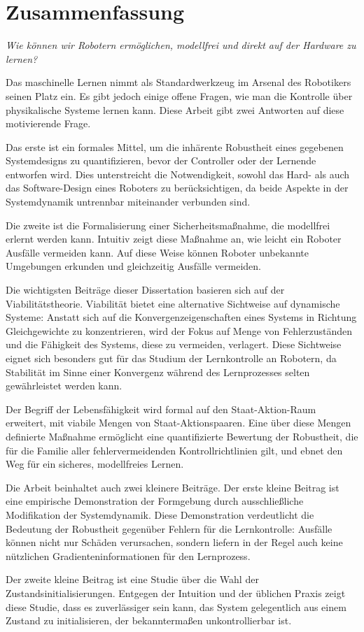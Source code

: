 
\chapter*{Zusammenfassung}
\emph{Wie können wir Robotern ermöglichen, modellfrei und direkt auf der Hardware zu lernen?} \par

Das maschinelle Lernen nimmt als Standardwerkzeug im Arsenal des Robotikers seinen Platz ein. Es gibt jedoch einige offene Fragen, wie man die Kontrolle über physikalische Systeme lernen kann. Diese Arbeit gibt zwei Antworten auf diese motivierende Frage. \par
Das erste ist ein formales Mittel, um die inhärente Robustheit eines gegebenen Systemdesigns zu quantifizieren, bevor der Controller oder der Lernende entworfen wird. Dies unterstreicht die Notwendigkeit, sowohl das Hard- als auch das Software-Design eines Roboters zu berücksichtigen, da beide Aspekte in der Systemdynamik untrennbar miteinander verbunden sind. \par
Die zweite ist die Formalisierung einer Sicherheitsmaßnahme, die modellfrei erlernt werden kann. Intuitiv zeigt diese Maßnahme an, wie leicht ein Roboter Ausfälle vermeiden kann. Auf diese Weise können Roboter unbekannte Umgebungen erkunden und gleichzeitig Ausfälle vermeiden. \par
Die wichtigsten Beiträge dieser Dissertation basieren sich auf der Viabilitätstheorie. Viabilität bietet eine alternative Sichtweise auf dynamische Systeme: Anstatt sich auf die Konvergenzeigenschaften eines Systems in Richtung Gleichgewichte zu konzentrieren, wird der Fokus auf Menge von Fehlerzuständen und die Fähigkeit des Systems, diese zu vermeiden, verlagert. Diese Sichtweise eignet sich besonders gut für das Studium der Lernkontrolle an Robotern, da Stabilität im Sinne einer Konvergenz während des Lernprozesses selten gewährleistet werden kann. \par
Der Begriff der Lebensfähigkeit wird formal auf den Staat-Aktion-Raum erweitert, mit viabile Mengen von Staat-Aktionspaaren. Eine über diese Mengen definierte Maßnahme ermöglicht eine quantifizierte Bewertung der Robustheit, die für die Familie aller fehlervermeidenden Kontrollrichtlinien gilt, und ebnet den Weg für ein sicheres, modellfreies Lernen. \par
Die Arbeit beinhaltet auch zwei kleinere Beiträge. Der erste kleine Beitrag ist eine empirische Demonstration der Formgebung durch ausschließliche Modifikation der Systemdynamik. Diese Demonstration verdeutlicht die Bedeutung der Robustheit gegenüber Fehlern für die Lernkontrolle: Ausfälle können nicht nur Schäden verursachen, sondern liefern in der Regel auch keine nützlichen Gradienteninformationen für den Lernprozess. \par
Der zweite kleine Beitrag ist eine Studie über die Wahl der Zustandsinitialisierungen. Entgegen der Intuition und der üblichen Praxis zeigt diese Studie, dass es zuverlässiger sein kann, das System gelegentlich aus einem Zustand zu initialisieren, der bekanntermaßen unkontrollierbar ist. 
